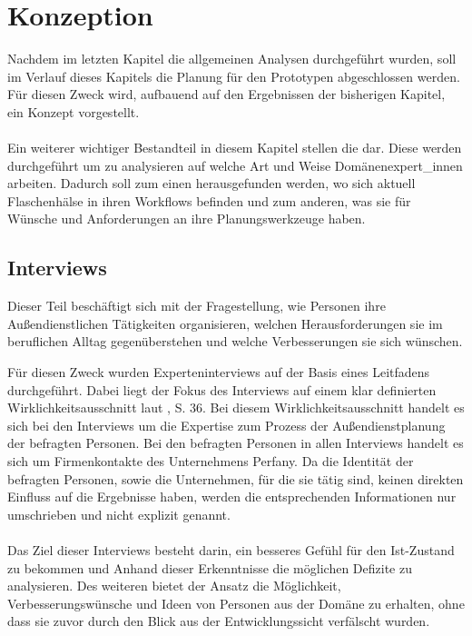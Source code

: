 \documentclass[Bachelorarbeit.tex]{subfiles}
\begin{document}
\chapter{Konzeption}
\label{chap:entwicklung}
Nachdem im letzten Kapitel die allgemeinen Analysen durchgeführt wurden, soll im Verlauf dieses Kapitels die Planung für den Prototypen abgeschlossen werden.
Für diesen Zweck wird, aufbauend auf den Ergebnissen der bisherigen Kapitel, ein Konzept vorgestellt.\\
\\
Ein weiterer wichtiger Bestandteil in diesem Kapitel stellen die  dar.
Diese  werden durchgeführt um zu analysieren auf welche Art und Weise  Domänenexpert\_innen arbeiten.
Dadurch soll zum einen herausgefunden werden, wo sich aktuell Flaschenhälse in ihren Workflows befinden und zum anderen, was sie für Wünsche und Anforderungen an ihre Planungswerkzeuge haben.\\


\section{Interviews}
\label{chap:analyse:sec:interviews}
Dieser Teil beschäftigt sich mit der Fragestellung, wie Personen ihre Außendienstlichen Tätigkeiten organisieren, welchen Herausforderungen sie im beruflichen Alltag gegenüberstehen und welche Verbesserungen sie sich wünschen. 

Für diesen Zweck wurden Experteninterviews auf der Basis eines Leitfadens durchgeführt.
Dabei liegt der Fokus des Interviews auf einem klar definierten Wirklichkeitsausschnitt laut \cite{Mayer2006}, S. 36.
Bei diesem Wirklichkeitsausschnitt handelt es sich bei den Interviews um die Expertise zum Prozess der Außendienstplanung der befragten Personen.
Bei den befragten Personen in allen Interviews handelt es sich um Firmenkontakte des Unternehmens Perfany.
Da die Identität der befragten Personen, sowie die Unternehmen, für die sie tätig sind, keinen direkten Einfluss auf die Ergebnisse haben, werden die entsprechenden Informationen nur umschrieben und nicht explizit genannt.\\
\\
Das Ziel dieser Interviews besteht darin, ein besseres Gefühl für den Ist-Zustand zu bekommen und Anhand dieser Erkenntnisse die möglichen Defizite zu analysieren.
Des weiteren bietet der Ansatz die Möglichkeit, Verbesserungswünsche und Ideen von Personen aus der Domäne zu erhalten, ohne dass sie zuvor durch den Blick aus der Entwicklungssicht verfälscht wurden.
\end{document}
